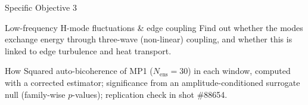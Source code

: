 \documentclass[aspectratio=169,xcolor=table]{beamer}
\begin{document}
\begin{frame}{Specific Objective 3}
    \vfill
    \begin{block}{Low-frequency H-mode fluctuations \& edge coupling}
        \large Find out whether the modes exchange energy through three-wave
        (non-linear) coupling, and whether this is linked to edge turbulence and heat transport.
    \end{block}
    \vspace{0.5cm}
    \begin{exampleblock}{How}
        \small Squared auto-bicoherence of MP1 ($N_{\text{ens}}=30$) in each window, computed with a corrected estimator;
        significance from an amplitude-conditioned surrogate null (family-wise $p$-values);
        replication check in shot \#88654.
    \end{exampleblock}
    \vfill
\end{frame}
\end{document}
